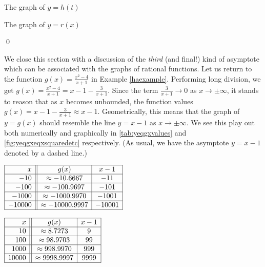 \begin{ex}
\begin{enumerate}
\begin{mfigure}


\caption{The graph of $y=h(t)$}
\label{fig:yeqhteqsixtcubedetc}
\end{mfigure}

\begin{mfigure}
  

\caption{The graph of $y=r(x)$}
\label{fig:yeqrxeqtwominusetc}
\end{mfigure}

\end{enumerate}

\qed

\end{ex}

We close this section with a discussion of the \textit{third} (and final!) kind of asymptote which can be associated with the graphs of rational functions. Let us return to the function $g(x) = \frac{x^2-4}{x+1}$ in Example \ref{haexample}. Performing long division, we get $g(x) = \frac{x^2-4}{x+1} = x-1 - \frac{3}{x+1}$.  Since the term $\frac{3}{x+1} \rightarrow 0$ as $x \rightarrow \pm \infty$, it stands to reason that as $x$ becomes unbounded, the function values   $g(x) = x-1 - \frac{3}{x+1} \approx x-1$.  Geometrically, this means that the graph of $y=g(x)$ should resemble the line $y = x-1$ as $x \rightarrow \pm \infty$.  We see this play out both numerically and graphically in \autoref{tab:yeqgxvalues} and \autoref{fig:yeqgxeqxsquaredetc} respectively. (As usual, we have the asymptote $y = x-1$ denoted by a dashed line.)

\begin{mtable}
  
$\begin{array}[t]{|r||c|c|}  \hline
  x & g(x) & x-1 \\ \hline
 -10 & \approx -10.6667 & -11 \\  \hline
 -100 & \approx -100.9697 & -101 \\  \hline 
 -1000 &  \approx -1000.9970&   -1001 \\ \hline 
  -10000 &  \approx -10000.9997 &  -10001 \\ \hline 
  \end{array} $

\medskip

$\begin{array}[t]{|r||c|c|}  \hline
  x & g(x) & x-1 \\ \hline
 10 & \approx 8.7273 &    9 \\\hline
 100 & \approx 98.9703 &   99 \\ \hline 
 1000 &  \approx 998.9970 &  999 \\ \hline 
  10000 &  \approx 9998.9997 &   9999 \\ \hline 
  \end{array} $

\caption{}
\label{tab:yeqgxvalues}
\end{mtable}
  
